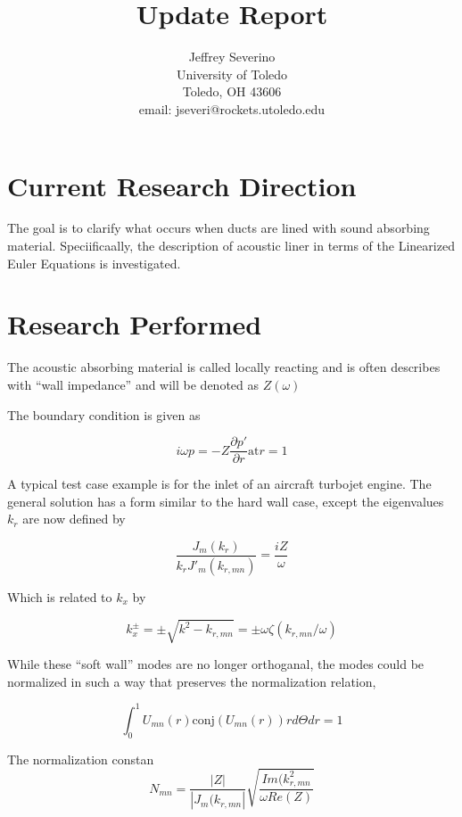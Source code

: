 \documentclass[a4paper]{article}
\begin{document}
\begin{titlepage}

    \title{
    Update Report}


    \author{ Jeffrey Severino \\
        University of Toledo \\
        Toledo, OH  43606 \\
    email: jseveri@rockets.utoledo.edu}


    \maketitle

\end{titlepage}
\section{Current Research Direction}
The goal is to clarify what occurs when ducts are lined 
with sound absorbing material.  Speciificaally, the description of acoustic liner
in terms of the Linearized Euler Equations is investigated.
\section{Research Performed}
The acoustic absorbing material is called locally reacting and is often 
describes with ``wall impedance'' and will be denoted as $Z(\omega)$

The boundary condition is given as

\[i \omega p = -Z \frac{\partial p'}{\partial r} \text{at} r = 1 \]

A typical test case example is for the inlet of an aircraft turbojet engine. 
The general solution has a form similar to the hard wall case, except the 
eigenvalues $k_r$ are now defined by

\[\frac{J_m(k_r) }{k_r J'_m (k_{r,mn})} = \frac{ i Z}{\omega}\]

Which is related to $k_{x}$ by 

\[k_{x}^{\pm} =  \pm \sqrt{ k^2 - k_{r,mn}} = \pm \omega \zeta(k_{r,mn}/\omega)\]

While these ``soft wall'' modes are no longer orthoganal, the modes could be normalized in such a way
that preserves the normalization relation,

\[ \int_0^1 U_{mn} (r) \text{conj}(U_{mn}(r)) r d\Theta dr = 1 \]

The normalization constan 
\[N_{mn} = \frac{|Z|}{|J_m(k_{r,mn}|} \sqrt{\frac{Im(k_{r,mn}^2}{\omega Re(Z)}}\]
\end{document}
